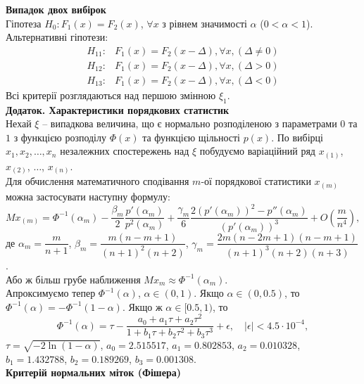 \textbf{Випадок двох вибірок} \\

Гіпотеза $H_0: F_1(x) = F_2(x)$, $\forall x$ з рівнем значимості $\alpha$ ($0 < \alpha < 1$). Альтернативні гіпотези:
\begin{align*}
    H_{11}: & F_1(x) = F_2(x - \Delta), \forall x, (\Delta \ne 0) \\
    H_{12}: & F_1(x) = F_2(x - \Delta), \forall x, (\Delta > 0) \\
    H_{13}: & F_1(x) = F_2(x - \Delta), \forall x, (\Delta < 0)
\end{align*}
Всі критерії розглядаються над першою змінною $\xi_1$. \\

\textbf{Додаток. Характеристики порядкових статистик} \\

Нехай $\xi$ -- випадкова величина, що є нормально розподіленою з параметрами $0$ та $1$ з функцією розподілу $\Phi(x)$ та функцією щільності $p(x)$. По вибірці $x_1, x_2, \ldots, x_n$ незалежних спостережень над $\xi$ побудуємо варіаційний ряд $x_{(1)}$, $x_{(2)}$, $\ldots$, $x_{(n)}$. \\

Для обчислення математичного сподівання $m$-ої порядкової статистики $x_{(m)}$ можна застосувати наступну формулу:
\[ M x_{(m)} = \Phi^{-1}(\alpha_m) - \dfrac{\beta_m}{2} \dfrac{p'(\alpha_m)}{p^2(\alpha_m)} + \dfrac{\gamma_m}{6} \dfrac{2 (p'(\alpha_m))^2 - p''(\alpha_m)}{(p'(\alpha_m))^3} + O \left(\dfrac{m}{n^4}\right), \]
де $\alpha_m = \dfrac{m}{n + 1}$, $\beta_m = \dfrac{m(n-m+1)}{(n+1)^2(n+2)}$, $\gamma_m = \dfrac{2m(n-2m+1)(n-m+1)}{(n+1)^3(n+2)(n+3)}$. \\

Або ж більш грубе наближення $M x_m \approx \Phi^{-1}(\alpha_m)$.  \\

Апроксимуємо тепер $\Phi^{-1}(\alpha)$, $\alpha\in (0, 1)$. Якщо $\alpha \in (0, 0.5)$, то $\Phi^{-1}(\alpha) = - \Phi^{-1}(1 - \alpha)$. Якщо ж $\alpha \in [0.5, 1)$, то \[ \Phi^{-1}(\alpha) = \tau - \dfrac{a_0 + a_1\tau + a_2\tau^2}{1 + b_1\tau + b_2\tau^2 + b_3\tau^3} + \epsilon, \quad |\epsilon| < 4.5 \cdot 10^{-4}, \] $\tau = \sqrt{-2\ln(1-\alpha)}$, $a_0 = 2.515517$, $a_1 = 0.802853$, $a_2 = 0.010328$, $b_1 = 1.432788$, $b_2 = 0.189269$, $b_3 = 0.001308$. \\

\textbf{Критерій нормальних міток (Фішера)} \\

